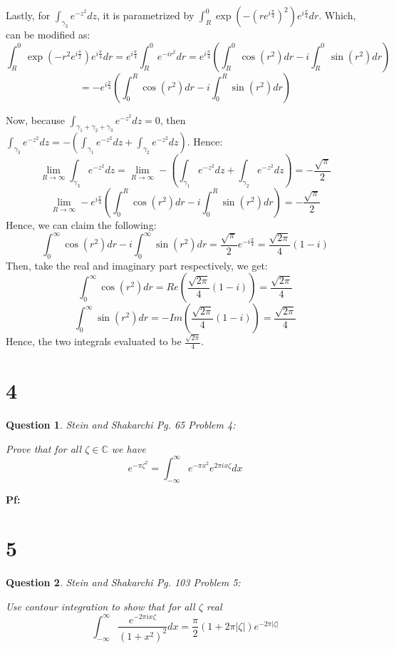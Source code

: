 \documentclass{article}
\newtheorem{question}{Question}
\begin{document}
\hfil

Lastly, for $\int_{\gamma_3}e^{-z^2}dz$, it is parametrized by $\int_{R}^{0}\exp(-(re^{i\frac{\pi}{4}})^2)e^{i\frac{\pi}{4}}dr$. Which, can be modified as:
$$\int_{R}^{0}\exp(-r^2e^{i\frac{\pi}{2}})e^{i\frac{\pi}{4}}dr = e^{i\frac{\pi}{4}}\int_{R}^{0}e^{-ir^2}dr = e^{i\frac{\pi}{4}}\left(\int_{R}^{0}\cos(r^2)dr - i\int_{R}^{0}\sin(r^2)dr\right)$$
$$=-e^{i\frac{\pi}{4}}\left(\int_{0}^{R}\cos(r^2)dr - i\int_{0}^{R}\sin(r^2)dr\right)$$

Now, because $\int_{\gamma_1+\gamma_2+\gamma_3}e^{-z^2}dz=0$, then $\int_{\gamma_3}e^{-z^2}dz = -(\int_{\gamma_1}e^{-z^2}dz+\int_{\gamma_2}e^{-z^2}dz)$. Hence:
$$\lim_{R\rightarrow\infty}\int_{\gamma_3}e^{-z^2}dz = \lim_{R\rightarrow\infty}-\left(\int_{\gamma_1}e^{-z^2}dz+\int_{\gamma_2}e^{-z^2}dz\right) = -\frac{\sqrt{\pi}}{2}$$
$$\lim_{R\rightarrow\infty}-e^{i\frac{\pi}{4}}\left(\int_{0}^{R}\cos(r^2)dr - i\int_{0}^{R}\sin(r^2)dr\right) = -\frac{\sqrt{\pi}}{2}$$
Hence, we can claim the following:
$$\int_{0}^{\infty}\cos(r^2)dr - i\int_{0}^{\infty}\sin(r^2)dr = \frac{\sqrt{\pi}}{2}e^{-i\frac{\pi}{4}} = \frac{\sqrt{2\pi}}{4}(1-i)$$
Then, take the real and imaginary part respectively, we get:
$$\int_{0}^{\infty}\cos(r^2)dr = Re\left(\frac{\sqrt{2\pi}}{4}(1-i)\right)=\frac{\sqrt{2\pi}}{4}$$
$$\int_{0}^{\infty}\sin(r^2)dr = -Im\left(\frac{\sqrt{2\pi}}{4}(1-i)\right)=\frac{\sqrt{2\pi}}{4}$$
Hence, the two integrals evaluated to be $\frac{\sqrt{2\pi}}{4}$.

\break

\section*{4}
\begin{myBox}[]{}
    \begin{question}
        Stein and Shakarchi Pg. 65 Problem 4:

        Prove that for all $\zeta\in \mathbb{C}$ we have 
        $$e^{-\pi \zeta^2}=\int_{-\infty}^{\infty}e^{-\pi x^2}e^{2\pi ix\zeta}dx$$
    \end{question}
\end{myBox}

\textbf{Pf:}

\break

\section*{5}
\begin{myBox}[]{}
    \begin{question}
        Stein and Shakarchi Pg. 103 Problem 5:

        Use contour integration to show that for all $\zeta$ real
        $$\int_{-\infty}^{\infty}\frac{e^{-2\pi ix\zeta}}{(1+x^2)^2}dx = \frac{\pi}{2}(1+2\pi |\zeta|)e^{-2\pi |\zeta|}$$
    \end{question}
\end{myBox}
\end{document}
